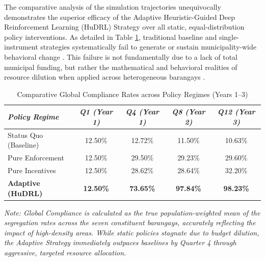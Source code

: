 The comparative analysis of the simulation trajectories unequivocally demonstrates the superior efficacy of the Adaptive Heuristic-Guided Deep Reinforcement Learning (HuDRL) Strategy over all static, equal-distribution policy interventions. As detailed in Table \ref{tab:policy_comparison}, traditional baseline and single-instrument strategies systematically fail to generate or sustain municipality-wide behavioral change \citep{Villanueva2021}. This failure is not fundamentally due to a lack of total municipal funding, but rather the mathematical and behavioral realities of resource dilution when applied across heterogeneous barangays \citep{Alphonso2024, Badua2022}.

\begin{table}[ht]
    \centering
    \caption{Comparative Global Compliance Rates across Policy Regimes (Years 1--3)}
    \label{tab:policy_comparison}
    \small
    \renewcommand{\arraystretch}{1.2}
    \begin{tabular}{l c c c c}
        \toprule
        \textit{Policy Regime} & \textit{Q1 (Year 1)} & \textit{Q4 (Year 1)} & \textit{Q8 (Year 2)} & \textit{Q12 (Year 3)} \\
        \midrule
        Status Quo (Baseline) & 12.50\% & 12.72\% & 11.50\% & 10.63\% \\
        Pure Enforcement & 12.50\% & 29.50\% & 29.23\% & 29.60\% \\
        Pure Incentives & 12.50\% & 28.62\% & 28.64\% & 32.20\% \\
        \textbf{Adaptive (HuDRL)} & \textbf{12.50\%} & \textbf{73.65\%} & \textbf{97.84\%} & \textbf{98.23\%} \\
        \bottomrule
    \end{tabular}
    \vspace{0.2cm}
    \begin{minipage}{0.9\textwidth}
        \footnotesize
        \textit{Note: Global Compliance is calculated as the true population-weighted mean of the segregation rates across the seven constituent barangays, accurately reflecting the impact of high-density areas. While static policies stagnate due to budget dilution, the Adaptive Strategy immediately outpaces baselines by Quarter 4 through aggressive, targeted resource allocation.}
    \end{minipage}
\end{table}

